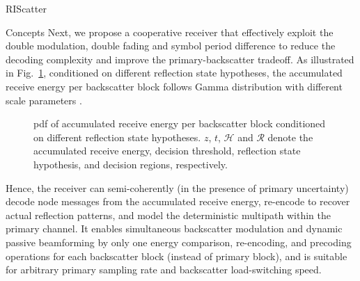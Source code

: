 \documentclass[journal]{IEEEtran}
\begin{document}
\begin{section}{RIScatter}
\begin{subsection}{Concepts}
		Next, we propose a cooperative receiver that effectively exploit the double modulation, double fading and symbol period difference to reduce the decoding complexity and improve the primary-backscatter tradeoff.
		As illustrated in Fig.~\ref{fg:energy_distribution}, conditioned on different reflection state hypotheses, the accumulated receive energy per backscatter block follows Gamma distribution with different scale parameters \cite{Qian2017b}.
		\begin{figure}[!t]
			\centering
			\resizebox{0.8\columnwidth}{!}{
				
			}
			\caption{
				\gls{pdf} of accumulated receive energy per backscatter block conditioned on different reflection state hypotheses.
				$z$, $t$, $\mathcal{H}$ and $\mathcal{R}$ denote the accumulated receive energy, decision threshold, reflection state hypothesis, and decision regions, respectively.
			}
			\label{fg:energy_distribution}
		\end{figure}
		Hence, the receiver can semi-coherently (in the presence of primary uncertainty) decode node messages from the accumulated receive energy, re-encode to recover actual reflection patterns, and model the deterministic multipath within the primary channel.
		It enables simultaneous backscatter modulation and dynamic passive beamforming by only one energy comparison, re-encoding, and precoding operations for each backscatter block (instead of primary block), and is suitable for arbitrary primary sampling rate and backscatter load-switching speed.
	\end{subsection}



\end{section}
\end{document}
